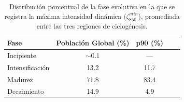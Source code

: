\begin{table}[htbp]
\centering
\caption[Fase evolutiva de máxima intensidad dinámica]{Distribución porcentual de la fase evolutiva en la que se registra la máxima intensidad dinámica ($\zeta_{850}^{min}$), promediada entre las tres regiones de ciclogénesis.}
\label{tab:fase_max_intensidad}
\begin{tabular*}{\textwidth}{@{\extracolsep{\fill}}lcccc}
\hline
\textbf{Fase} & \textbf{Población Global (\%)} & \textbf{p90 (\%)} \\ 
\hline
Incipiente       & $\sim$0.1 & ---  \\
Intensificación  & 13.2      & 11.7 \\
Madurez          & 71.8      & 83.4 \\
Decaimiento      & 14.9      & 4.9  \\ 
\hline
\end{tabular*}
\end{table}



